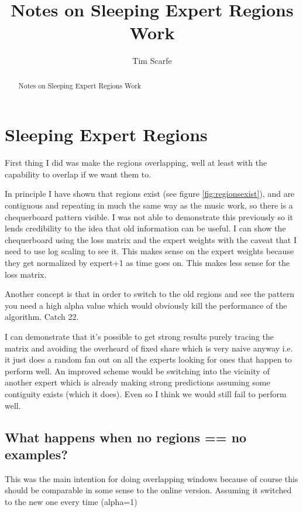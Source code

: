 \documentclass[envcountsame]{llncs}
\institute{Computer Learning Research
 Centre and Department of Computer Science, \\ 
Royal Holloway,  University of London, Egham, Surrey, TW20 0EX, United Kingdom\\
\email{tim@cs.rhul.ac.uk}}
\title{
Notes on Sleeping Expert Regions Work}
\author{Tim Scarfe}
\begin{document}
\maketitle

\begin{abstract}
Notes on Sleeping Expert Regions Work
\end{abstract}

\section{Sleeping Expert Regions}

First thing I did was make the regions overlapping, well at least with the capability to overlap if we want them to. 

In principle I have shown that regions exist (see figure \ref{fig:regionsexist}), and are contiguous and repeating in much the same way as the music work, so there is a chequerboard pattern visible. I was not able to demonstrate this previously so it lends credibility to the idea that old information can be useful. I can show the chequerboard using the loss matrix and the expert weights with the caveat that I need to use log scaling to see it. This makes sense on the expert weights because they get normalized by expert+1 as time goes on. This makes less sense for the loss matrix. 

Another concept is that in order to switch to the old regions and see the pattern you need a high alpha value which would obviously kill the performance of the algorithm. Catch 22. 

I can demonstrate that it's possible to get strong results purely tracing the matrix and avoiding the overheard of fixed share which is very naive anyway i.e. it just does a random fan out on all the experts looking for ones that happen to perform well. An improved scheme would be switching into the vicinity of another expert which is already making strong predictions assuming some contiguity exists (which it does). Even so I think we would still fail to perform well.

\subsection{What happens when no regions == no examples?}

This was the main intention for doing overlapping windows because of course this should be comparable in some sense to the online version. Assuming it switched to the new one every time (alpha=1) 
\end{document}
